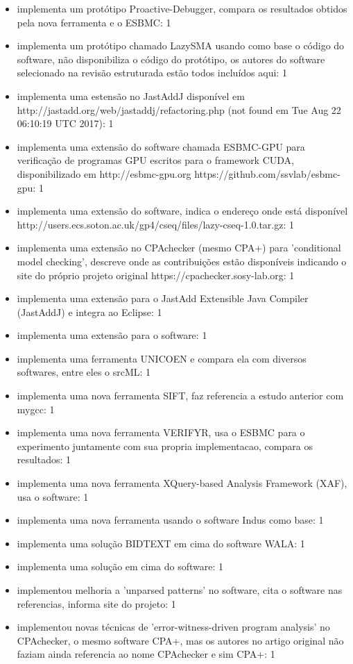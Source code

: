 \begin{itemize}
\item implementa um protótipo Proactive-Debugger, compara os resultados obtidos pela nova ferramenta e o ESBMC: 1
\item implementa um protótipo chamado LazySMA usando como base o código do software, não disponibiliza o código do protótipo, os autores do software selecionado na revisão estruturada estão todos incluídos aqui: 1
\item implementa uma estensão no JastAddJ disponível em http://jastadd.org/web/jastaddj/refactoring.php (not found em Tue Aug 22 06:10:19 UTC 2017): 1
\item implementa uma extensão do software chamada ESBMC-GPU para verificação de programas GPU escritos para o framework CUDA, disponibilizado em http://esbmc-gpu.org https://github.com/ssvlab/esbmc-gpu: 1
\item implementa uma extensão do software, indica o endereço onde está disponível http://users.ecs.soton.ac.uk/gp4/cseq/files/lazy-cseq-1.0.tar.gz: 1
\item implementa uma extensão no CPAchecker (mesmo CPA+) para 'conditional model checking', descreve onde as contribuições estão disponíveis indicando o site do próprio projeto original https://cpachecker.sosy-lab.org: 1
\item implementa uma extensão para o JastAdd Extensible Java Compiler (JastAddJ) e integra ao Eclipse: 1
\item implementa uma extensão para o software: 1
\item implementa uma ferramenta UNICOEN e compara ela com diversos softwares, entre eles o srcML: 1
\item implementa uma nova ferramenta SIFT, faz referencia a estudo anterior com mygcc: 1
\item implementa uma nova ferramenta VERIFYR, usa o ESBMC para o experimento juntamente com sua propria implementacao, compara os resultados: 1
\item implementa uma nova ferramenta XQuery-based Analysis Framework (XAF), usa o software: 1
\item implementa uma nova ferramenta usando o software Indus como base: 1
\item implementa uma solução BIDTEXT em cima do software WALA: 1
\item implementa uma solução em cima do software: 1
\item implementou melhoria a 'unparsed patterns' no software, cita o software nas referencias, informa site do projeto: 1
\item implementou novas técnicas de 'error-witness-driven program analysis' no CPAchecker, o mesmo software CPA+, mas os autores no artigo original não faziam ainda referencia ao nome CPAchecker e sim CPA+: 1

\end{itemize}
